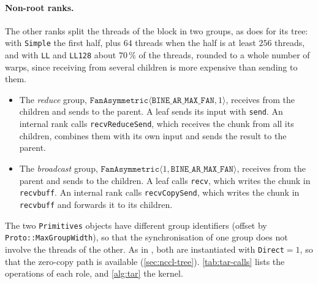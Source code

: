 \paragraph{Non-root ranks.}
The other ranks split the threads of the block in two groups, as \nccl{} does for its tree: with \texttt{Simple} the first half, plus $64$ threads when the half is at least $256$ threads, and with \texttt{LL} and \texttt{LL128} about $70\,\%$ of the threads, rounded to a whole number of warps, since receiving from several children is more expensive than sending to them.
\begin{itemize}
  \item The \emph{reduce} group, $\texttt{FanAsymmetric}\langle\texttt{BINE\_AR\_MAX\_FAN},1\rangle$, receives from the children and sends to the parent.
  A leaf sends its input with \texttt{send}. An internal rank calls \texttt{recvReduceSend}, which receives the chunk from all its children, combines them with its own input and sends the result to the parent.
  \item The \emph{broadcast} group, $\texttt{FanAsymmetric}\langle1,\texttt{BINE\_AR\_MAX\_FAN}\rangle$, receives from the parent and sends to the children.
  A leaf calls \texttt{recv}, which writes the chunk in \texttt{recvbuff}. An internal rank calls \texttt{recvCopySend}, which writes the chunk in \texttt{recvbuff} and forwards it to its children.
\end{itemize}
The two \texttt{Primitives} objects have different group identifiers (offset by \texttt{Proto::Max\allowbreak GroupWidth}), so that the synchronisation of one group does not involve the threads of the other.
As in \nccl{}, both are instantiated with \texttt{Direct}$=1$, so that the zero-copy path is available (\cref{sec:nccl-tree}).
\cref{tab:tar-calls} lists the operations of each role, and \cref{alg:tar} the kernel.
